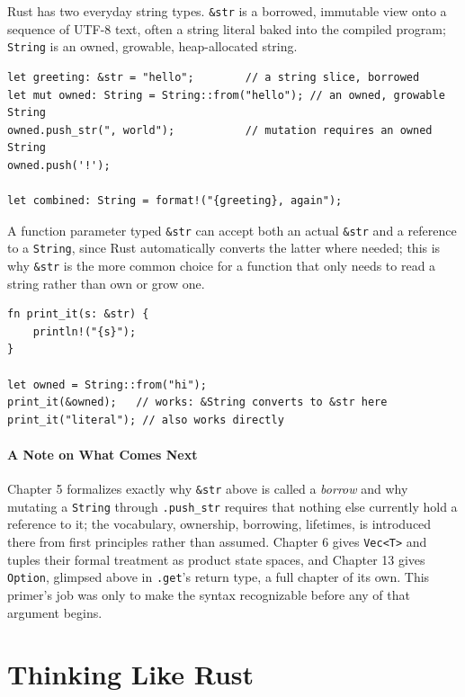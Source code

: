 \documentclass[11pt]{book}
\begin{document}
Rust has two everyday string types. \texttt{\&str} is a borrowed, immutable view onto a sequence of UTF-8 text, often a string literal baked into the compiled program; \texttt{String} is an owned, growable, heap-allocated string.

\begin{lstlisting}
let greeting: &str = "hello";        // a string slice, borrowed
let mut owned: String = String::from("hello"); // an owned, growable String
owned.push_str(", world");           // mutation requires an owned String
owned.push('!');

let combined: String = format!("{greeting}, again");
\end{lstlisting}

A function parameter typed \texttt{\&str} can accept both an actual \texttt{\&str} and a reference to a \texttt{String}, since Rust automatically converts the latter where needed; this is why \texttt{\&str} is the more common choice for a function that only needs to read a string rather than own or grow one.

\begin{lstlisting}
fn print_it(s: &str) {
    println!("{s}");
}

let owned = String::from("hi");
print_it(&owned);   // works: &String converts to &str here
print_it("literal"); // also works directly
\end{lstlisting}

\subsection*{A Note on What Comes Next}

Chapter 5 formalizes exactly why \texttt{\&str} above is called a \emph{borrow} and why mutating a \texttt{String} through \texttt{.push\_str} requires that nothing else currently hold a reference to it; the vocabulary, ownership, borrowing, lifetimes, is introduced there from first principles rather than assumed. Chapter 6 gives \texttt{Vec<T>} and tuples their formal treatment as product state spaces, and Chapter 13 gives \texttt{Option}, glimpsed above in \texttt{.get}'s return type, a full chapter of its own. This primer's job was only to make the syntax recognizable before any of that argument begins.

\clearpage

\part{Thinking Like Rust}
\end{document}
